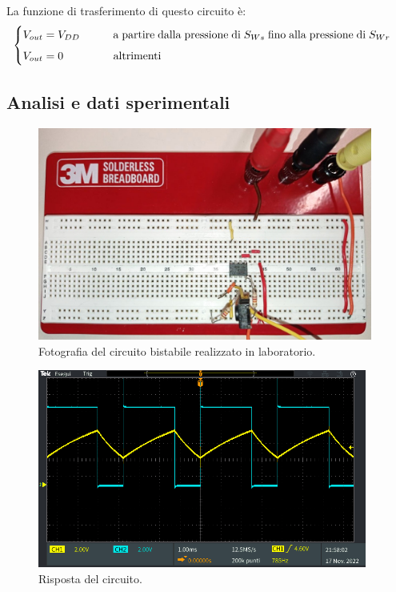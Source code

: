 \documentclass{report}
\begin{document}
\noindent La funzione di trasferimento di questo circuito è:
\begin{equation}
	\begin{cases}
		V_{out}= V_{DD}\indent\indent \mathrm{a\;partire\;dalla\;pressione\;di\;} S_{Ws} \mathrm{\;fino\;alla\;pressione\;di\;} S_{Wr}\\[5pt]
		V_{out}= 0\indent\indent\indent \mathrm{altrimenti}\\
	\end{cases}
\end{equation}
\subsection{Analisi e dati sperimentali}
\begin{figure}[h!]
	\centering
	\includegraphics[height=7cm]{immagini/circuito2}
	\caption{Fotografia del circuito bistabile realizzato in laboratorio.}
	\label{figura:circuito2}
\end{figure}
\begin{figure}[h!]
	\centering
	\includegraphics[height=6.5cm]{immagini/TEK00018}
	\caption{Risposta del circuito.}
	\label{figura:TEK00018}
\end{figure}
\end{document}
